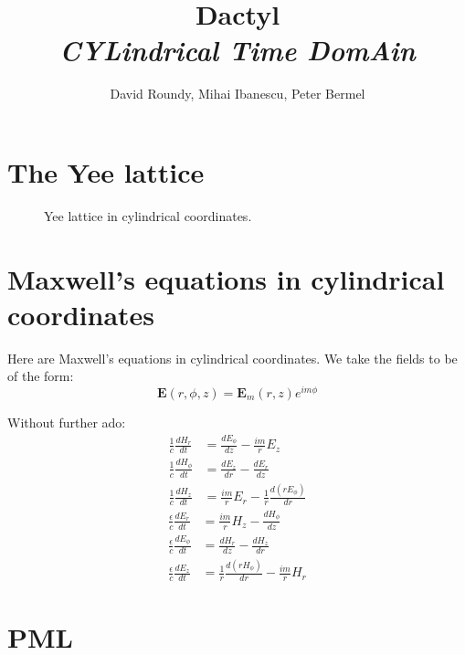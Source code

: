 \documentclass[floats]{report}
\begin{document}
\title{
    Dactyl\\
{\Large \it CYLindrical Time DomAin}
}
\author{
    David Roundy, Mihai Ibanescu, Peter Bermel
}

\maketitle 

\tableofcontents

\chapter{The Yee lattice}

\begin{figure}
\caption{Yee lattice in cylindrical coordinates.
\label{yee_fig}}
\centering
\mbox{}
\vspace{13cm}
\end{figure}

\chapter{Maxwell's equations in cylindrical coordinates}

Here are Maxwell's equations in cylindrical coordinates.  We take the
fields to be of the form:
\begin{equation*}
\mathbf{E}(r,\phi,z) = \mathbf{E}_m(r,z)e^{i m \phi} 
\end{equation*}

Without further ado:
\begin{align}
\frac1c\frac{dH_r}{dt} &= \frac{dE_\phi}{dz} - \frac{im}r E_z\\
\frac1c\frac{dH_\phi}{dt} &= \frac{dE_z}{dr} - \frac{dE_r}{dz}\\
\frac1c\frac{dH_z}{dt} &= \frac{im}r E_r - \frac1r\frac{d(rE_\phi)}{dr}
\end{align}
\begin{align}
\frac\epsilon c\frac{dE_r}{dt} &= \frac{im}r H_z - \frac{dH_\phi}{dz} \\
\frac\epsilon c\frac{dE_\phi}{dt} &= \frac{dH_r}{dz} - \frac{dH_z}{dr} \\
\frac\epsilon c\frac{dE_z}{dt} &= \frac1r\frac{d(rH_\phi)}{dr} - \frac{im}r H_r
\end{align}


\chapter{PML}
\end{document}
